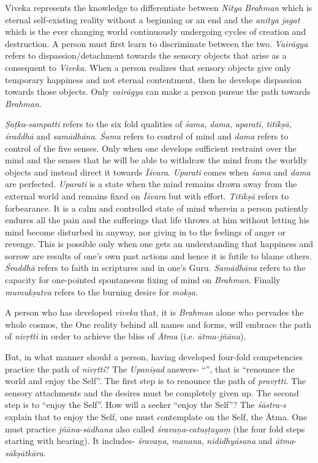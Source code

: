 Viveka represents the knowledge to differentiate between \emph{Nitya} \emph{Brahman} which is eternal self-existing reality without a beginning or an end and the \emph{anitya} \emph{jagat} which is the ever changing world continuously undergoing cycles of creation and destruction. A person must first learn to discriminate between the two. \emph{Vairāgya} refers to dispassion/detachment towards the sensory objects that arise as a consequent to \emph{Viveka}. When a person realizes that sensory objects give only temporary happiness and not eternal contentment, then he develops dispassion towards those objects. Only \emph{vairāgya} can make a person pursue the path towards \emph{Brahman}.
\vskip 1.1pt

\emph{Ṣaṭka}-\emph{sampatti} refers to the six fold qualities of \emph{śama}, \emph{dama}, \emph{uparati}, \emph{titikṣā}, \emph{śraddhā} and \emph{samādhāna}. \emph{Śama} refers to control of mind and \emph{dama} refers to control of the five senses. Only when one develops sufficient restraint over the mind and the senses that he will be able to withdraw the mind from the worldly objects and instead direct it towards \emph{Īśvara}. \emph{Uparati} comes when \emph{śama} and \emph{dama} are perfected. \emph{Uparati} is a state when the mind remains drawn away from the external world and remains fixed on \emph{Īśvara} but with effort. \emph{Titikṣā} refers to forbearance. It is a calm and controlled state of mind wherein a person patiently endures all the pain and the sufferings that life throws at him without letting his mind become disturbed in anyway, nor giving in to the feelings of anger or revenge. This is possible only when one gets an understanding that happiness and sorrow are results of one's own past actions and hence it is futile to blame others. \emph{Śraddhā} refers to faith in scriptures and in one's Guru. \emph{Samādhāna} refers to the capacity for one-pointed spontaneous fixing of mind on \emph{Brahman}. Finally \emph{mumukṣutva} refers to the burning desire for \emph{mokṣa}.
\vskip 1.1pt

A person who has developed \emph{viveka} that, it is \emph{Brahman} alone who pervades the whole cosmos, the One reality behind all names and forms, will embrace the path of \emph{nivṛtti} in order to achieve the bliss of \emph{Ātma} (i.e. \emph{ātma-jñāna}).
\vskip 1.1pt

But, in what manner should a person, having developed four-fold competencies practice the path of \emph{nivṛtti}? The \emph{Upaniṣad} answers- ``'', that is ``renounce the world and enjoy the Self''. The first step is to renounce the path of \emph{pravṛtti}. The sensory attachments and the desires must be completely given up. The second step is to ``enjoy the Self''. How will a seeker ``enjoy the Self''? The \emph{śāstra-s} explain that to enjoy the Self, one must contemplate on the Self, the Ātma. One must practice \emph{jñāna}-\emph{sādhana} also called \emph{śravaṇa}-\emph{catuṣṭayaṃ} (the four fold steps starting with hearing). It includes- \emph{śravaṇa}, \emph{manana}, \emph{nididhyāsana} and \emph{ātma}-\emph{sākṣātkāra}.
\vskip 1.1pt

